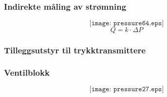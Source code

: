\documentclass[aspectratio=169,xcolor=dvipsnames]{beamer}
\begin{document}
%
%
\begin{frame}
	\frametitle{Indirekte måling av strømning}

	$$\texttt{[image: pressure64.eps]}$$
	$$Q=k\cdot \Delta P$$
\end{frame}
%
%
%
%
%
%
%
\begin{frame}
	\frametitle{Tilleggsutstyr til trykktransmittere}

\end{frame}

%
%
%
%
%
%
%
%
%
\begin{frame}
	\frametitle{Ventilblokk}

	$$\texttt{[image: pressure27.eps]}$$
\end{frame}
\end{document}
